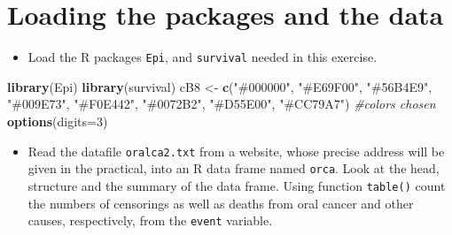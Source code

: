 \documentclass[
]{book}
\newenvironment{Shaded}{\begin{snugshade}}{\end{snugshade}}
\newcommand{\AttributeTok}[1]{\textcolor[rgb]{0.13,0.29,0.53}{#1}}
\newcommand{\CommentTok}[1]{\textcolor[rgb]{0.56,0.35,0.01}{\textit{#1}}}
\newcommand{\ConstantTok}[1]{\textcolor[rgb]{0.56,0.35,0.01}{#1}}
\newcommand{\DecValTok}[1]{\textcolor[rgb]{0.00,0.00,0.81}{#1}}
\newcommand{\FunctionTok}[1]{\textcolor[rgb]{0.13,0.29,0.53}{\textbf{#1}}}
\newcommand{\NormalTok}[1]{#1}
\newcommand{\OtherTok}[1]{\textcolor[rgb]{0.56,0.35,0.01}{#1}}
\newcommand{\SpecialCharTok}[1]{\textcolor[rgb]{0.81,0.36,0.00}{\textbf{#1}}}
\newcommand{\StringTok}[1]{\textcolor[rgb]{0.31,0.60,0.02}{#1}}
\providecommand{\tightlist}{%
  \setlength{\itemsep}{0pt}\setlength{\parskip}{0pt}}
\begin{document}
\section{Loading the packages and the data}\label{loading-the-packages-and-the-data}

\begin{itemize}
\tightlist
\item
  Load the R packages \texttt{Epi}, and \texttt{survival} needed in this exercise.
\end{itemize}

\begin{Shaded}
\begin{Highlighting}[]
\FunctionTok{library}\NormalTok{(Epi)}
\FunctionTok{library}\NormalTok{(survival)}
\NormalTok{cB8  }\OtherTok{\textless{}{-}} \FunctionTok{c}\NormalTok{(}\StringTok{"\#000000"}\NormalTok{, }\StringTok{"\#E69F00"}\NormalTok{, }\StringTok{"\#56B4E9"}\NormalTok{, }\StringTok{"\#009E73"}\NormalTok{, }
          \StringTok{"\#F0E442"}\NormalTok{, }\StringTok{"\#0072B2"}\NormalTok{, }\StringTok{"\#D55E00"}\NormalTok{, }\StringTok{"\#CC79A7"}\NormalTok{) }\CommentTok{\#colors chosen}
\FunctionTok{options}\NormalTok{(}\AttributeTok{digits=}\DecValTok{3}\NormalTok{)}
\end{Highlighting}
\end{Shaded}

\begin{itemize}
\tightlist
\item
  Read the datafile \texttt{oralca2.txt} from
  a website, whose precise address will be given in the practical,
  into an R data frame named \texttt{orca}.
  Look at the head, structure and the summary of the data frame.
  Using function \texttt{table()} count the numbers of censorings
  as well as deaths from oral cancer and other causes, respectively,
  from the \texttt{event} variable.
\end{itemize}

\begin{Shaded}
\end{Shaded}
\end{document}
